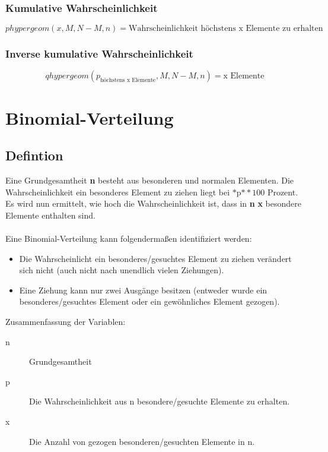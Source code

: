 \documentclass[a4paper,10pt]{article}
\begin{document}
\subsubsection{Kumulative Wahrscheinlichkeit}
\begin{equation}
  \label{eq:2}
  phypergeom(x, M, N - M, n) = \text{Wahrscheinlichkeit höchstens x Elemente zu erhalten}
\end{equation}

\subsubsection{Inverse kumulative Wahrscheinlichkeit}
\begin{equation}
  \label{eq:6}
  qhypergeom(p_{\text {höchstens x Elemente}}, M, N - M, n) = \text{x Elemente}
\end{equation}

\section{Binomial-Verteilung}
\subsection{Defintion}
Eine Grundgesamtheit \textbf{n} besteht aus besonderen und normalen
Elementen. Die Wahrscheinlichkeit ein besonderes Element zu ziehen
liegt bei $ \text{*p*} * 100 $ Prozent. Es wird nun ermittelt, wie
hoch die Wahrscheinlichkeit ist, dass in \textbf{n} \textbf{x} besondere Elemente
enthalten sind.
\\\\
Eine Binomial-Verteilung kann folgendermaßen identifiziert werden:
\begin{itemize}
\item Die Wahrscheinlicht ein besonderes/gesuchtes Element zu ziehen
  verändert sich nicht (auch nicht nach unendlich vielen Ziehungen).
\item Eine Ziehung kann nur zwei Ausgänge besitzen (entweder wurde ein
  besonderes/gesuchtes Element oder ein gewöhnliches Element gezogen).
\end{itemize}

Zusammenfassung der Variablen:
\begin{description}
\item[n] Grundgesamtheit
\item[p] Die Wahrscheinlichkeit aus n besondere/gesuchte Elemente zu
  erhalten.
\item[x] Die Anzahl von gezogen besonderen/gesuchten Elemente in n.
\end{description}
\end{document}
